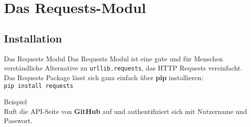 \section{Das Requests-Modul}
\subsection{Installation}
\begin{frame}{Das Requests Modul}
	Das Requests Modul ist eine gute und für Menschen verständliche Alternative
	zu \texttt{urllib.requests}, das HTTP Requests vereinfacht. \\[.75cm]

	Das Requests Package lässt sich ganz einfach über \textbf{pip} installieren: \\
	\texttt{pip install requests}
\end{frame}

\begin{frame}{Beispiel}
	 \ \\[.5cm]
	Ruft die API-Seite von \textbf{GitHub} auf und authentifiziert sich mit Nutzername und Passwort.
\end{frame}


